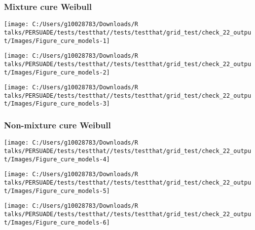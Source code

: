 \documentclass[
]{article}
\begin{document}
\clearpage

\clearpage

\subsubsection{Mixture cure Weibull}\label{mixture-cure-weibull}

\begin{flushleft}\texttt{[image: C:/Users/g10028783/Downloads/R talks/PERSUADE/tests/testthat//tests/testthat/grid\_test/check\_22\_output/Images/Figure\_cure\_models-1]} \end{flushleft}

\begin{flushleft}\texttt{[image: C:/Users/g10028783/Downloads/R talks/PERSUADE/tests/testthat//tests/testthat/grid\_test/check\_22\_output/Images/Figure\_cure\_models-2]} \end{flushleft}

\begin{flushleft}\texttt{[image: C:/Users/g10028783/Downloads/R talks/PERSUADE/tests/testthat//tests/testthat/grid\_test/check\_22\_output/Images/Figure\_cure\_models-3]} \end{flushleft}

\clearpage

\subsubsection{Non-mixture cure Weibull}\label{non-mixture-cure-weibull}

\begin{flushleft}\texttt{[image: C:/Users/g10028783/Downloads/R talks/PERSUADE/tests/testthat//tests/testthat/grid\_test/check\_22\_output/Images/Figure\_cure\_models-4]} \end{flushleft}

\begin{flushleft}\texttt{[image: C:/Users/g10028783/Downloads/R talks/PERSUADE/tests/testthat//tests/testthat/grid\_test/check\_22\_output/Images/Figure\_cure\_models-5]} \end{flushleft}

\begin{flushleft}\texttt{[image: C:/Users/g10028783/Downloads/R talks/PERSUADE/tests/testthat//tests/testthat/grid\_test/check\_22\_output/Images/Figure\_cure\_models-6]} \end{flushleft}
\end{document}
